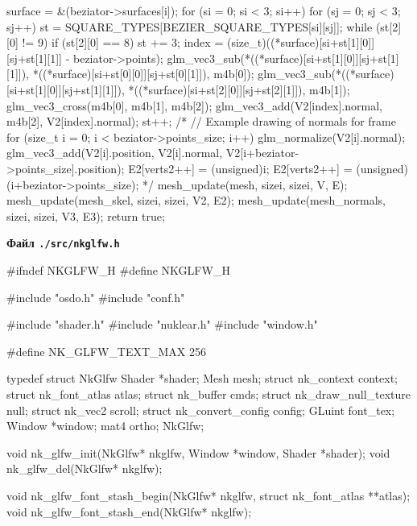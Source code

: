 \documentclass[14pt,a4paper]{extarticle}
\theoremstyle{definition}
\renewcommand{\[}{\begin{singlespace}\begin{equation*}}
\renewcommand{\]}{\end{equation*}\end{singlespace}}
\begin{document}
\begin{multicols}{2}
\begin{ccode}
{{        surface = &(beziator->surfaces[i]);
        for (si = 0; si < 3; si++) {
            for (sj = 0; sj < 3; sj++) {
                st = SQUARE_TYPES[BEZIER_SQUARE_TYPES[si][sj]];
                while (st[2][0] != 9) {
                    if (st[2][0] == 8) {
                        st += 3;
                    }
                    index = (size_t)((*surface)[si+st[1][0]][sj+st[1][1]] - beziator->points);
                    glm_vec3_sub(*((*surface)[si+st[1][0]][sj+st[1][1]]),
                            *((*surface)[si+st[0][0]][sj+st[0][1]]), m4b[0]);
                    glm_vec3_sub(*((*surface)[si+st[1][0]][sj+st[1][1]]),
                            *((*surface)[si+st[2][0]][sj+st[2][1]]), m4b[1]);
                    glm_vec3_cross(m4b[0], m4b[1], m4b[2]);
                    glm_vec3_add(V2[index].normal, m4b[2], V2[index].normal);
                    st++;
                }
            }
        }
    }
    /*
    // Example drawing of normals for frame
    for (size_t i = 0; i < beziator->points_size; i++) {
        glm_normalize(V2[i].normal);
        glm_vec3_add(V2[i].position, V2[i].normal,
                     V2[i+beziator->points_size].position);
        E2[verts2++] = (unsigned)i;
        E2[verts2++] = (unsigned)(i+beziator->points_size);
    }*/
    mesh_update(mesh, sizei, sizei, V, E);
    mesh_update(mesh_skel, sizei, sizei, V2, E2);
    mesh_update(mesh_normals, sizei, sizei, V3, E3);
    return true;
}
\end{ccode}
\noindent\cprotect\textbf{Файл \verb+./src/nkglfw.h+}
\begin{ccode}
#ifndef NKGLFW_H
#define NKGLFW_H

#include "osdo.h"
#include "conf.h"

#include "shader.h"
#include "nuklear.h"
#include "window.h"

#define NK_GLFW_TEXT_MAX 256

typedef struct NkGlfw {
    Shader *shader;
    Mesh mesh;
    struct nk_context context;
    struct nk_font_atlas atlas;
    struct nk_buffer cmds;
    struct nk_draw_null_texture null;
    struct nk_vec2 scroll;
    struct nk_convert_config config;
    GLuint font_tex;
    Window *window;
    mat4 ortho;
} NkGlfw;

void nk_glfw_init(NkGlfw* nkglfw, Window *window, Shader *shader);
void nk_glfw_del(NkGlfw* nkglfw);

void nk_glfw_font_stash_begin(NkGlfw* nkglfw,
                              struct nk_font_atlas **atlas);
void nk_glfw_font_stash_end(NkGlfw* nkglfw);


\end{ccode}
\end{multicols}
\end{document}
